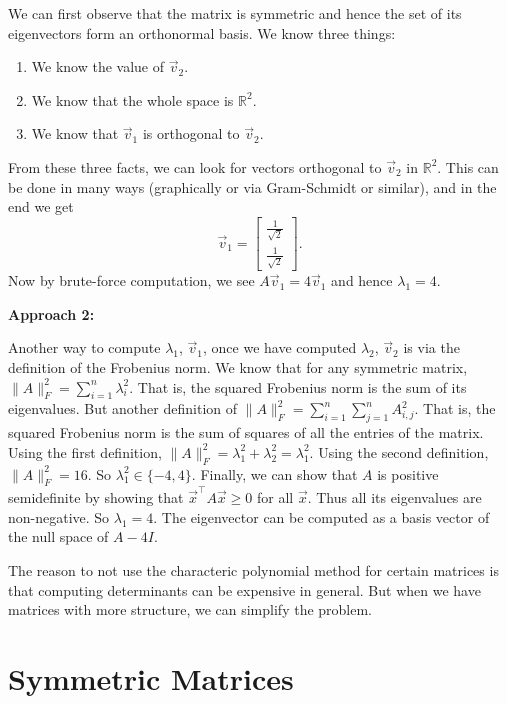 \documentclass[10pt]{article}
\newcommand{\RR}{\mathbb{R}}
\begin{document}
\begin{enumerate}[label=(\alph*)]
    We can first observe that the matrix is symmetric and hence the set of its eigenvectors form an orthonormal basis. We know three things:
    \begin{enumerate}[label=\roman*.]
        \item We know the value of $\vec{v}_2$.
        \item We know that the whole space is $\RR^2$.
        \item We know that $\vec{v}_1$ is orthogonal to $\vec{v}_2$.
    \end{enumerate}
    From these three facts, we can look for vectors orthogonal to $\vec{v}_2$ in $\RR^2$. This can be done in many ways (graphically or via Gram-Schmidt or similar), and in the end we get
    \begin{equation}
        \vec{v}_1 = \begin{bmatrix} \frac{1}{\sqrt{2}} \\ \frac{1}{\sqrt{2}} \end{bmatrix}.
    \end{equation}
    Now by brute-force computation, we see $A\vec{v}_1 = 4\vec{v}_1$ and hence $\lambda_1 = 4$.

    \textbf{Approach 2:}

    Another way to compute $\lambda_1$, $\vec{v}_1$, once we have computed $\lambda_2$, $\vec{v}_2$ is via the definition of the Frobenius norm. We know that for any symmetric matrix, $\|A\|_F^2 = \sum_{i=1}^{n} \lambda_i^2$. That is, the squared Frobenius norm is the sum of its eigenvalues. But another definition of $\|A\|_F^2 = \sum_{i=1}^{n} \sum_{j=1}^{n} A_{i,j}^2$. That is, the squared Frobenius norm is the sum of squares of all the entries of the matrix. Using the first definition, $\|A\|_F^2 = \lambda_1^2 + \lambda_2^2 = \lambda_1^2$. Using the second definition, $\|A\|_F^2 = 16$. So $\lambda_1^2 \in \{-4, 4\}$. Finally, we can show that $A$ is positive semidefinite by showing that $\vec{x}^\top A\vec{x} \geq 0$ for all $\vec{x}$. Thus all its eigenvalues are non-negative. So $\lambda_1 = 4$. The eigenvector can be computed as a basis vector of the null space of $A - 4I$.

    The reason to not use the characteric polynomial method for certain matrices is that computing determinants can be expensive in general. But when we have matrices with more structure, we can simplify the problem.
\end{enumerate}

\newpage

\section{Symmetric Matrices}
\end{document}
